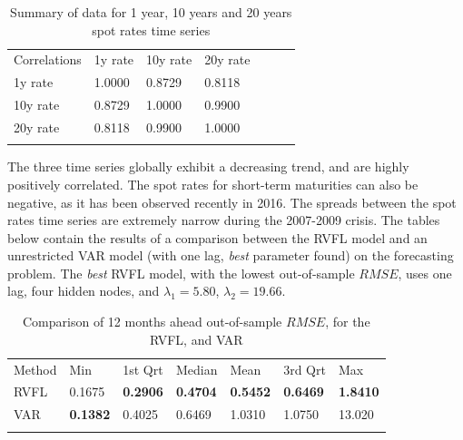 \begin{table}[!htb]
\begin{center}
\caption{Summary of data for 1 year, 10 years and 20 years spot rates time series}
\label{tab:three_ts_cor}       %
\begin{tabular}{lllllll}
\hline\noalign{\smallskip}
Correlations & 1y rate & 10y rate  & 20y rate \\
\noalign{\smallskip}\hline\noalign{\smallskip}
  1y rate  & 1.0000  & 0.8729 & 0.8118\\
  10y rate & 0.8729 & 1.0000 & 0.9900 \\
  20y rate & 0.8118 & 0.9900 & 1.0000 \\
\noalign{\smallskip}\hline
\end{tabular}
\end{center}
\end{table}

The three time series globally exhibit a decreasing trend, and are highly positively correlated. The spot rates for short-term maturities can also be negative, as it has been observed recently in 2016. The spreads between the spot rates time series are extremely narrow during the 2007-2009 crisis. The tables below contain the results of a comparison between the RVFL model and an unrestricted VAR model (with one lag, \textit{best} parameter found) on the forecasting problem. The \textit{best} RVFL model, with the lowest out-of-sample $RMSE$, uses one lag, four hidden nodes, and $\lambda_1 = 5.80$, $\lambda_2 = 19.66$.

\begin{table}[!htb]
\begin{center}
\caption{Comparison of 12 months ahead out-of-sample $RMSE$, for the RVFL, and VAR}
\label{tab:benchmark2}       %
\begin{tabular}{lllllll}
\hline\noalign{\smallskip}
Method & Min & 1st Qrt  & Median & Mean  & 3rd Qrt  & Max  \\
\noalign{\smallskip}\hline\noalign{\smallskip}
  RVFL & 0.1675 & \textbf{0.2906} & \textbf{0.4704} & \textbf{0.5452} & \textbf{0.6469} & \textbf{1.8410} \\
  VAR &  \textbf{0.1382} & 0.4025 & 0.6469 & 1.0310 & 1.0750 & 13.020 \\
\noalign{\smallskip}\hline
\end{tabular}
\end{center}
\end{table}

